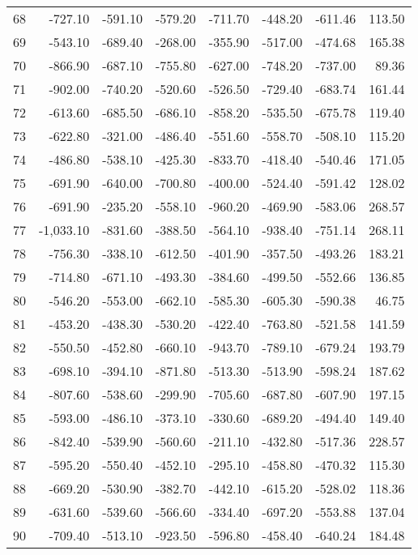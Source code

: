 \begin{longtable}{rrrrrrrr}
68 & -727.10 & -591.10 & -579.20 & -711.70 & -448.20 & -611.46 & 113.50  \\
69 & -543.10 & -689.40 & -268.00 & -355.90 & -517.00 & -474.68 & 165.38  \\
70 & -866.90 & -687.10 & -755.80 & -627.00 & -748.20 & -737.00 & 89.36  \\
71 & -902.00 & -740.20 & -520.60 & -526.50 & -729.40 & -683.74 & 161.44  \\
72 & -613.60 & -685.50 & -686.10 & -858.20 & -535.50 & -675.78 & 119.40  \\
73 & -622.80 & -321.00 & -486.40 & -551.60 & -558.70 & -508.10 & 115.20  \\
74 & -486.80 & -538.10 & -425.30 & -833.70 & -418.40 & -540.46 & 171.05  \\
75 & -691.90 & -640.00 & -700.80 & -400.00 & -524.40 & -591.42 & 128.02  \\
76 & -691.90 & -235.20 & -558.10 & -960.20 & -469.90 & -583.06 & 268.57  \\
77 & -1,033.10 & -831.60 & -388.50 & -564.10 & -938.40 & -751.14 & 268.11  \\
78 & -756.30 & -338.10 & -612.50 & -401.90 & -357.50 & -493.26 & 183.21  \\
79 & -714.80 & -671.10 & -493.30 & -384.60 & -499.50 & -552.66 & 136.85  \\
80 & -546.20 & -553.00 & -662.10 & -585.30 & -605.30 & -590.38 & 46.75  \\
81 & -453.20 & -438.30 & -530.20 & -422.40 & -763.80 & -521.58 & 141.59  \\
82 & -550.50 & -452.80 & -660.10 & -943.70 & -789.10 & -679.24 & 193.79  \\
83 & -698.10 & -394.10 & -871.80 & -513.30 & -513.90 & -598.24 & 187.62  \\
84 & -807.60 & -538.60 & -299.90 & -705.60 & -687.80 & -607.90 & 197.15  \\
85 & -593.00 & -486.10 & -373.10 & -330.60 & -689.20 & -494.40 & 149.40  \\
86 & -842.40 & -539.90 & -560.60 & -211.10 & -432.80 & -517.36 & 228.57  \\
87 & -595.20 & -550.40 & -452.10 & -295.10 & -458.80 & -470.32 & 115.30  \\
88 & -669.20 & -530.90 & -382.70 & -442.10 & -615.20 & -528.02 & 118.36  \\
89 & -631.60 & -539.60 & -566.60 & -334.40 & -697.20 & -553.88 & 137.04  \\
90 & -709.40 & -513.10 & -923.50 & -596.80 & -458.40 & -640.24 & 184.48  \\

\end{longtable}
